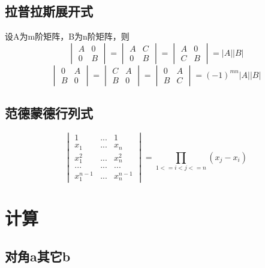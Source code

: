 \subsection{拉普拉斯展开式}

设A为m阶矩阵，B为n阶矩阵，则
\[\begin{vmatrix}
A & 0 \\
0 & B
\end{vmatrix} = \begin{vmatrix}
A & C \\
0 & B
\end{vmatrix} = \begin{vmatrix}
A & 0 \\
C & B
\end{vmatrix} = |A||B|\]
\[\begin{vmatrix}
0 & A \\
B & 0
\end{vmatrix} = \begin{vmatrix}
C & A \\
B & 0
\end{vmatrix} = \begin{vmatrix}
0 & A \\
B & C
\end{vmatrix} = (-1)^{mn}|A||B|\]


\subsection{范德蒙德行列式}

\[\begin{vmatrix}
1 & ... & 1 \\
x_1 & ... & x_n \\ 
x_1^2 & ... & x_n^2 \\ 
... & ... & ... \\ 
x_1^{n-1} & ... & x_n^{n-1}
\end{vmatrix} = \prod_{1<=i<j<=n}(x_j-x_i)\]


\section{计算}

\subsection{对角a其它b}

